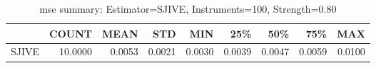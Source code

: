 \begin{table}[ht]
\centering
\caption{mse summary: Estimator=SJIVE, Instruments=100, Strength=0.80}
\begin{tabular}{lrrrrrrrr}
\toprule
 & COUNT & MEAN & STD & MIN & 25\% & 50\% & 75\% & MAX \\
\midrule
SJIVE & 10.0000 & 0.0053 & 0.0021 & 0.0030 & 0.0039 & 0.0047 & 0.0059 & 0.0100 \\
\bottomrule
\end{tabular}
\end{table}
